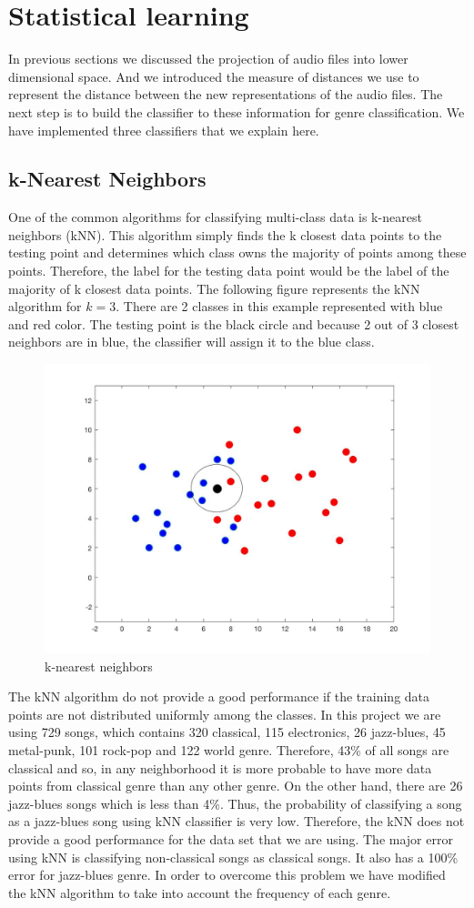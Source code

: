 \documentclass[12pt]{article}
\begin{document}
\section{Statistical learning}
In previous sections we discussed the projection of audio files into lower dimensional space. And we introduced the measure of distances we use to represent the distance between the new representations of the audio files. The next step is to build the classifier to these information for genre classification. We have implemented three classifiers that we explain here.
\subsection{k-Nearest Neighbors}
One of the common algorithms for classifying multi-class data is k-nearest neighbors (kNN). This algorithm simply finds the k closest data points to the testing point and determines which class owns the majority of points among these points. Therefore, the label for the testing data point would be the label of the majority of k closest data points.
The following figure represents the kNN algorithm for $k = 3$. There are 2 classes in this example represented with blue and red color. The testing point is the black circle and because 2 out of 3 closest neighbors are in blue, the classifier will assign it to the blue class.
\begin{figure}[H]\label{kNN}
	\centering
	\includegraphics[width=.8\linewidth]{kNN.jpg}
	\caption{k-nearest neighbors}
\end{figure}

The kNN algorithm do not provide a good performance if the training data points are not distributed uniformly among the classes. In this project we are using 729 songs, which contains 320 classical, 115 electronics, 26 jazz-blues, 45 metal-punk, 101 rock-pop and 122 world genre. Therefore, 43\% of all songs are classical and so, in any neighborhood it is more probable to have more data points from classical genre than any other genre. On the other hand, there are 26 jazz-blues songs which is less than 4\%. Thus, the probability of classifying a song as a jazz-blues song using kNN classifier is very low. Therefore, the kNN does not provide a good performance for the data set that we are using. The major error using kNN is classifying non-classical songs as classical songs. It also has a 100\% error for jazz-blues genre. In order to overcome this problem we have modified the kNN algorithm to take into account the frequency of each genre.
\end{document}
